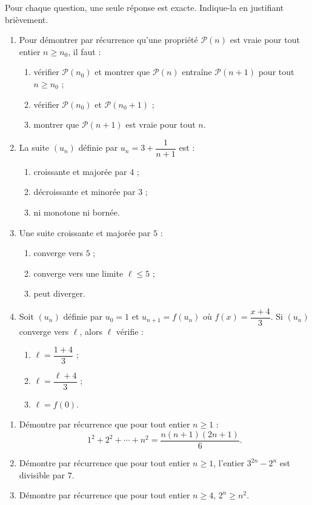 \documentclass[11pt]{article}
\begin{document}
\begin{exercice}
Pour chaque question, une seule réponse est exacte. Indique-la en justifiant brièvement.
\begin{enumerate}
\item Pour démontrer par récurrence qu'une propriété $\mathcal{P}(n)$ est vraie pour tout entier $n \geq n_0$, il faut :
\begin{enumerate}
\item vérifier $\mathcal{P}(n_0)$ et montrer que $\mathcal{P}(n)$ entraîne $\mathcal{P}(n+1)$ pour tout $n \geq n_0$ ;
\item vérifier $\mathcal{P}(n_0)$ et $\mathcal{P}(n_0 + 1)$ ;
\item montrer que $\mathcal{P}(n+1)$ est vraie pour tout $n$.
\end{enumerate}
\item La suite $(u_n)$ définie par $u_n = 3 + \dfrac{1}{n+1}$ est :
\begin{enumerate}
\item croissante et majorée par $4$ ;
\item décroissante et minorée par $3$ ;
\item ni monotone ni bornée.
\end{enumerate}
\item Une suite croissante et majorée par $5$ :
\begin{enumerate}
\item converge vers $5$ ;
\item converge vers une limite $\ell \leq 5$ ;
\item peut diverger.
\end{enumerate}
\item Soit $(u_n)$ définie par $u_0 = 1$ et $u_{n+1} = f(u_n)$ où $f(x) = \dfrac{x+4}{3}$. Si $(u_n)$ converge vers $\ell$, alors $\ell$ vérifie :
\begin{enumerate}
\item $\ell = \dfrac{1+4}{3}$ ;
\item $\ell = \dfrac{\ell + 4}{3}$ ;
\item $\ell = f(0)$.
\end{enumerate}
\end{enumerate}
\end{exercice}

\begin{exercice}
\begin{enumerate}
\item Démontre par récurrence que pour tout entier $n \geq 1$ :
\[ 1^2 + 2^2 + \cdots + n^2 = \frac{n(n+1)(2n+1)}{6}. \]
\item Démontre par récurrence que pour tout entier $n \geq 1$, l'entier $3^{2n} - 2^n$ est divisible par $7$.
\item Démontre par récurrence que pour tout entier $n \geq 4$, $2^n \geq n^2$.
\end{enumerate}
\end{exercice}
\end{document}
